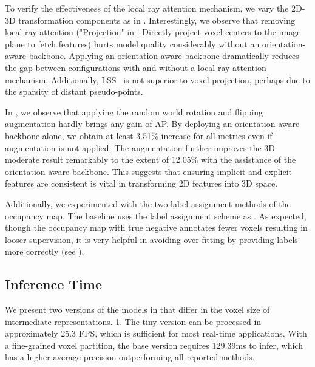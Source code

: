 \documentclass[10pt,twocolumn,letterpaper]{article}
\begin{document}
\noindent \fontsize{10pt}{\baselineskip}\selectfont {\bf Local Ray Attention Mechanism.}
To verify the effectiveness of the local ray attention mechanism, we vary the 2D-3D transformation components as in . Interestingly, we observe that removing local ray attention ("Projection" in : Directly project voxel centers to the image plane to fetch features) hurts model quality considerably without an orientation-aware backbone. Applying an orientation-aware backbone dramatically reduces the gap between configurations with and without a local ray attention mechanism. Additionally, LSS~\cite{10.1007/978-3-030-58568-6_12} is not superior to voxel projection, perhaps due to the sparsity of distant pseudo-points.

\noindent \fontsize{10pt}{\baselineskip}\selectfont {\bf Orientation-Aware 2D Image Backbone.}
In , we observe that applying the random world rotation and flipping augmentation hardly brings any gain of AP. By deploying an orientation-aware backbone alone, we obtain at least 3.51\% increase for all metrics even if augmentation is not applied. The augmentation further improves the 3D moderate result remarkably to the extent of 12.05\% with the assistance of the orientation-aware backbone. This suggests that ensuring implicit and explicit features are consistent is vital in transforming 2D features into 3D space.

\noindent \fontsize{10pt}{\baselineskip}\selectfont {\bf Occupancy Supervision with True Negative.}
Additionally, we experimented with the two label assignment methods of the occupancy map. The baseline uses the label assignment scheme as . As expected, though the occupancy map with true negative annotates fewer voxels resulting in looser supervision, it is very helpful in avoiding over-fitting by providing labels more correctly (see ).
\setlength{\parskip}{0pt}

\subsection{Inference Time}
We present two versions of the models in  that differ in the voxel size of intermediate representations. 1. The tiny version can be processed in approximately 25.3 FPS, which is sufficient for most real-time applications. With a fine-grained voxel partition, the base version requires 129.39ms to infer, which has a higher average precision outperforming all reported methods.
\end{document}
